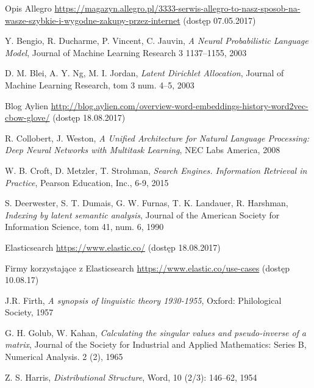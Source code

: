 \documentclass[pl]{minipw} %
\begin{document}
\begin{thebibliography}{30}
		Opis Allegro
		\url{https://magazyn.allegro.pl/3333-serwis-allegro-to-nasz-sposob-na-wasze-szybkie-i-wygodne-zakupy-przez-internet}
		(dostęp 07.05.2017)
	
		Y. Bengio, R. Ducharme, P. Vincent, C. Jauvin,
		\emph{A Neural Probabilistic Language Model},
		Journal of Machine Learning Research 3 1137–1155,
		2003
	
		D. M. Blei, A. Y. Ng, M. I. Jordan,
		\emph{Latent Dirichlet Allocation},
		Journal of Machine Learning Research, tom 3 num. 4–5,
		2003
		
		Blog Aylien
		\url{http://blog.aylien.com/overview-word-embeddings-history-word2vec-cbow-glove/}
		(dostęp 18.08.2017)
	
		R. Collobert, J. Weston,
		\emph{A Unified Architecture for Natural Language Processing: Deep Neural Networks with Multitask Learning},
		NEC Labs America,
		2008
	
		W. B. Croft, D. Metzler, T. Strohman,
		\emph{Search Engines. Information Retrieval in Practice},
		Pearson Education, Inc.,
		6-9,
		2015
		
		S. Deerwester, S. T. Dumais, G. W. Furnas, T. K. Landauer, R. Harshman,
		\emph{Indexing by latent semantic analysis},
		Journal of the American Society for Information Science, tom 41, num. 6,
		1990
	
		Elasticsearch
		\url{https://www.elastic.co/}
		(dostęp 18.08.2017)
	
		Firmy korzystające z Elasticsearch
		\url{https://www.elastic.co/use-cases}
		(dostęp 10.08.17)
	
		J.R. Firth,
		\emph{A synopsis of linguistic theory 1930-1955},
		Oxford: Philological Society,
		1957
	
		G. H. Golub, W. Kahan,
		\emph{Calculating the singular values and pseudo-inverse of a matrix},
		Journal of the Society for Industrial and Applied Mathematics: Series B, Numerical Analysis. 2 (2),
		1965
	
		Z. S. Harris,
		\emph{Distributional Structure},
		Word,
		10 (2/3): 146–62,
		1954
	

\end{thebibliography}
\end{document}
